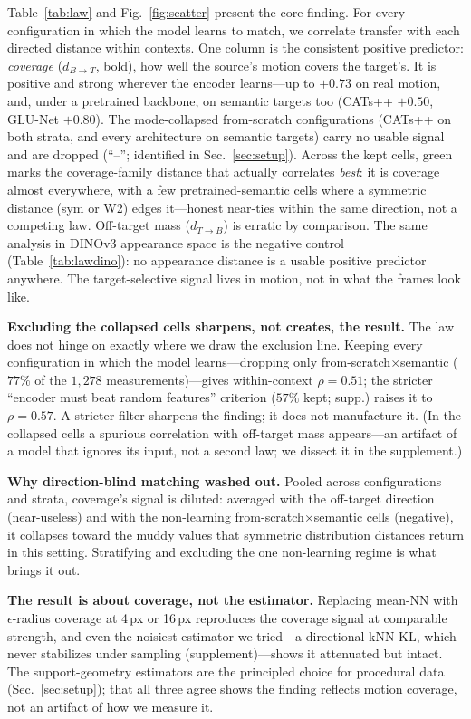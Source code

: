 \documentclass[runningheads]{llncs}
\newcommand{\dtb}{d_{T\to B}}
\newcommand{\dbt}{d_{B\to T}}
\newcommand{\bst}[1]{\textcolor{green!60!black}{#1}}
\begin{document}
Table~\ref{tab:law} and Fig.~\ref{fig:scatter} present the core finding. For
every configuration in which the model learns to match, we correlate transfer
with each directed distance within contexts. One column is the consistent
positive predictor: \emph{coverage} ($\dbt$, bold), how well the source's motion
covers the target's. It is positive and strong wherever the encoder learns---up
to $+0.73$ on real motion, and, under a pretrained backbone, on semantic targets
too (CATs++ $+0.50$, GLU-Net $+0.80$). The mode-collapsed from-scratch
configurations (CATs++ on both strata, and every architecture on semantic
targets) carry no usable signal and are dropped (``--''; identified in
Sec.~\ref{sec:setup}). Across the kept cells, \bst{green} marks the
coverage-family distance that actually correlates \emph{best}: it is coverage
almost everywhere, with a few pretrained-semantic cells where a symmetric distance
(sym or W2) edges it---honest near-ties within the same direction, not a competing
law. Off-target mass ($\dtb$) is erratic by comparison. The same analysis in
DINOv3 appearance space is the negative control (Table~\ref{tab:lawdino}): no
appearance distance is a usable positive predictor anywhere. The target-selective
signal lives in motion, not in what the frames look like.


\noindent\textbf{Excluding the collapsed cells sharpens, not creates, the
result.} The law does not hinge on exactly where we draw the exclusion line.
Keeping every configuration in which the model learns---dropping only
from-scratch$\times$semantic ($77\%$ of the $1{,}278$ measurements)---gives
within-context $\rho{=}0.51$; the stricter ``encoder must beat random features''
criterion ($57\%$ kept; supp.) raises it to $\rho{=}0.57$. A stricter filter
sharpens the finding; it does not manufacture it. (In the collapsed cells a
spurious correlation with off-target mass appears---an artifact of a model that
ignores its input, not a second law; we dissect it in the supplement.)

\noindent\textbf{Why direction-blind matching washed out.} Pooled across
configurations and strata, coverage's signal is diluted: averaged with the
off-target direction (near-useless) and with the non-learning
from-scratch$\times$semantic cells (negative), it collapses toward the muddy
values that symmetric distribution distances return in this setting. Stratifying
and excluding the one non-learning regime is what brings it out.

\noindent\textbf{The result is about coverage, not the estimator.} Replacing
mean-NN with $\epsilon$-radius coverage at 4\,px or 16\,px reproduces the
coverage signal at comparable strength, and even the noisiest estimator we
tried---a directional kNN-KL, which never stabilizes under sampling
(supplement)---shows it attenuated but intact. The support-geometry estimators
are the principled choice for procedural data (Sec.~\ref{sec:setup}); that all
three agree shows the finding reflects motion coverage, not an artifact of how
we measure it.
\end{document}

